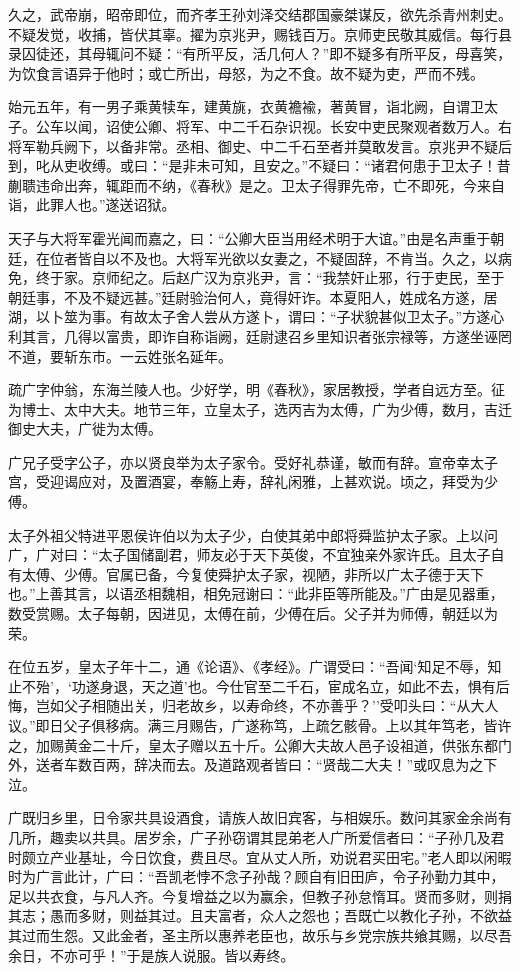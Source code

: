 \documentclass[]{article}
\begin{document}
久之，武帝崩，昭帝即位，而齐孝王孙刘泽交结郡国豪桀谋反，欲先杀青州刺史。不疑发觉，收捕，皆伏其辜。擢为京兆尹，赐钱百万。京师吏民敬其威信。每行县录囚徒还，其母辄问不疑：``有所平反，活几何人？''即不疑多有所平反，母喜笑，为饮食言语异于他时；或亡所出，母怒，为之不食。故不疑为吏，严而不残。

始元五年，有一男子乘黄犊车，建黄旐，衣黄襜褕，著黄冒，诣北阙，自谓卫太子。公车以闻，诏使公卿、将军、中二千石杂识视。长安中吏民聚观者数万人。右将军勒兵阙下，以备非常。丞相、御史、中二千石至者并莫敢发言。京兆尹不疑后到，叱从吏收缚。或曰：``是非未可知，且安之。''不疑曰：``诸君何患于卫太子！昔蒯聩违命出奔，辄距而不纳，《春秋》是之。卫太子得罪先帝，亡不即死，今来自诣，此罪人也。''遂送诏狱。

天子与大将军霍光闻而嘉之，曰：``公卿大臣当用经术明于大谊。''由是名声重于朝廷，在位者皆自以不及也。大将军光欲以女妻之，不疑固辞，不肯当。久之，以病免，终于家。京师纪之。后赵广汉为京兆尹，言：``我禁奸止邪，行于吏民，至于朝廷事，不及不疑远甚。''廷尉验治何人，竟得奸诈。本夏阳人，姓成名方遂，居湖，以卜筮为事。有故太子舍人尝从方遂卜，谓曰：``子状貌甚似卫太子。''方遂心利其言，几得以富贵，即诈自称诣阙，廷尉逮召乡里知识者张宗禄等，方遂坐诬罔不道，要斩东市。一云姓张名延年。

疏广字仲翁，东海兰陵人也。少好学，明《春秋》，家居教授，学者自远方至。征为博士、太中大夫。地节三年，立皇太子，选丙吉为太傅，广为少傅，数月，吉迁御史大夫，广徙为太傅。

广兄子受字公子，亦以贤良举为太子家令。受好礼恭谨，敏而有辞。宣帝幸太子宫，受迎谒应对，及置酒宴，奉觞上寿，辞礼闲雅，上甚欢说。顷之，拜受为少傅。

太子外祖父特进平恩侯许伯以为太子少，白使其弟中郎将舜监护太子家。上以问广，广对曰：``太子国储副君，师友必于天下英俊，不宜独亲外家许氏。且太子自有太傅、少傅。官属已备，今复使舜护太子家，视陋，非所以广太子德于天下也。''上善其言，以语丞相魏相，相免冠谢曰：``此非臣等所能及。''广由是见器重，数受赏赐。太子每朝，因进见，太傅在前，少傅在后。父子并为师傅，朝廷以为荣。

在位五岁，皇太子年十二，通《论语》、《孝经》。广谓受曰：``吾闻`知足不辱，知止不殆'，`功遂身退，天之道'也。今仕官至二千石，宦成名立，如此不去，惧有后悔，岂如父子相随出关，归老故乡，以寿命终，不亦善乎？''受叩头曰：``从大人议。''即日父子俱移病。满三月赐告，广遂称笃，上疏乞骸骨。上以其年笃老，皆许之，加赐黄金二十斤，皇太子赠以五十斤。公卿大夫故人邑子设祖道，供张东都门外，送者车数百两，辞决而去。及道路观者皆曰：``贤哉二大夫！''或叹息为之下泣。

广既归乡里，日令家共具设酒食，请族人故旧宾客，与相娱乐。数问其家金余尚有几所，趣卖以共具。居岁余，广子孙窃谓其昆弟老人广所爱信者曰：``子孙几及君时颇立产业基址，今日饮食，费且尽。宜从丈人所，劝说君买田宅。''老人即以闲暇时为广言此计，广曰：``吾凯老悖不念子孙哉？顾自有旧田庐，令子孙勤力其中，足以共衣食，与凡人齐。今复增益之以为赢余，但教子孙怠惰耳。贤而多财，则捐其志；愚而多财，则益其过。且夫富者，众人之怨也；吾既亡以教化子孙，不欲益其过而生怨。又此金者，圣主所以惠养老臣也，故乐与乡党宗族共飨其赐，以尽吾余日，不亦可乎！''于是族人说服。皆以寿终。
\end{document}
